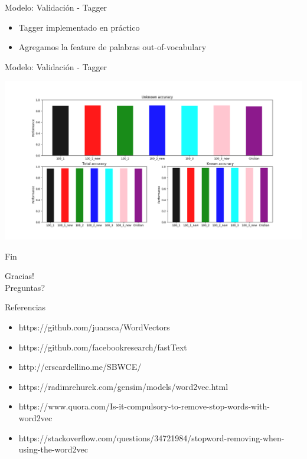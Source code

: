 \documentclass[10pt]{beamer}
\begin{document}
\begin{frame}{Modelo: Validación - Tagger}
  \begin{itemize}[<+->]
    \item Tagger implementado en práctico
    \item Agregamos la feature de palabras out-of-vocabulary
  \end{itemize}
\end{frame}


\begin{frame}{Modelo: Validación - Tagger}
  \begin{center}
    \includegraphics[width=1\textwidth]{tagger1.png}
  \end{center}
\end{frame}


\begin{frame}{Fin}
  \begin{center}
    Gracias! \\ Preguntas?
  \end{center}
\end{frame}


\begin{frame}{Referencias}
  \begin{itemize}
    \item https://github.com/juansca/WordVectors
    \item https://github.com/facebookresearch/fastText
    \item http://crscardellino.me/SBWCE/
    \item https://radimrehurek.com/gensim/models/word2vec.html
    \item https://www.quora.com/Is-it-compulsory-to-remove-stop-words-with-word2vec
    \item https://stackoverflow.com/questions/34721984/stopword-removing-when-using-the-word2vec

  \end{itemize}
\end{frame}



\appendix
\end{document}
